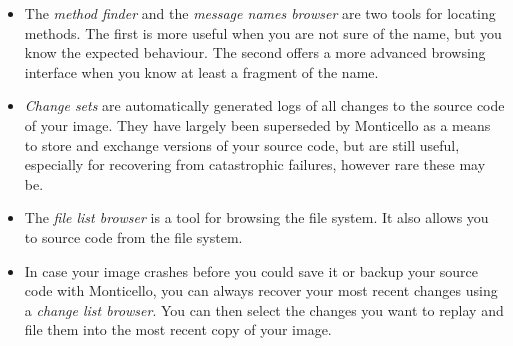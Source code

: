 \documentclass[a4paper,10pt,twoside]{book}
\begin{document}
\begin{itemize}
  \item The \emph{method finder} and the \emph{message names browser} are two tools for locating methods. The first is more useful when you are not sure of the name, but you know the expected behaviour. The second offers a more advanced browsing interface when you know at least a fragment of the name.
  \item \emph{Change sets} are automatically generated logs of all changes to the source code of your image. They have largely been superseded by Monticello as a means to store and exchange versions of your source code, but are still useful, especially for recovering from catastrophic failures, however rare these may be.
  \item The \emph{file list browser} is a tool for browsing the file system. It also allows you to  source code from the file system.
  \item In case your image crashes before you could save it or backup your source code with Monticello, you can always recover your most recent changes using a \emph{change list browser}. You can then select the changes you want to replay and file them into the most recent copy of your image.
\end{itemize}

\ifx\wholebook\relax\else
\end{document}
